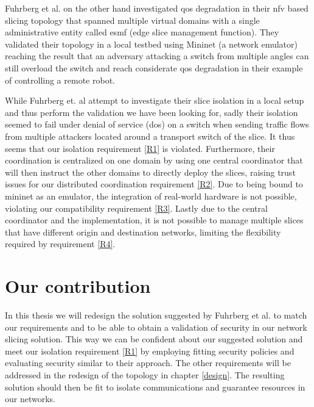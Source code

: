 Fuhrberg et al. \cite{SE4} on the other hand investigated \acrshort{qos} degradation in their \acrshort{nfv} based slicing topology that spanned multiple virtual domains with a single administrative entity called \acrshort{esmf} (edge slice management function). They validated their topology in a local testbed using Mininet \cite{mininet} (a network emulator) reaching the result that an adversary attacking a switch from multiple angles can still overload the switch and reach considerate \acrshort{qos} degradation in their example of controlling a remote robot.

While Fuhrberg et. al \cite{SE4} attempt to investigate their slice isolation in a local setup and thus perform the validation we have been looking for, sadly their isolation seemed to fail under denial of service (\acrshort{dos}) on a switch when sending traffic flows from multiple attackers located around a transport switch of the slice. It thus seems that our isolation requirement \ref{R1} is violated. Furthermore, their coordination is centralized on one domain by using one central coordinator that will then instruct the other domains to directly deploy the slices, raising trust issues for our distributed coordination requirement \ref{R2}. Due to being bound to mininet \cite{mininet} as an emulator, the integration of real-world hardware is not possible, violating our compatibility requirement \ref{R3}. Lastly due to the central coordinator and the implementation, it is not possible to manage multiple slices that have different origin and destination networks, limiting the flexibility required by requirement \ref{R4}.


\section{Our contribution}
In this thesis we will redesign the solution suggested by Fuhrberg et al. \cite{SE4} to match our requirements and to be able to obtain a validation of security in our network slicing solution. This way we can be confident about our suggested solution and meet our isolation requirement \ref{R1} by employing fitting security policies and evaluating security similar to their approach. The other requirements will be addressed in the redesign of the topology in chapter \ref{design}. The resulting solution should then be fit to isolate communications and guarantee resources in our networks.


